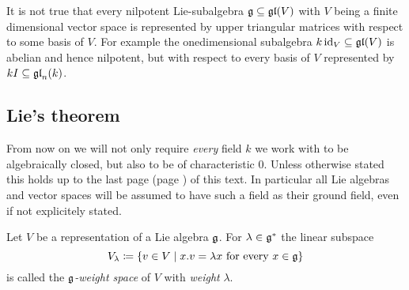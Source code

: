 \begin{rem}
 It is not true that every nilpotent Lie-subalgebra $\mathfrak{g} \subseteq \mathfrak{gl}(V)$ with $V$ being a finite dimensional vector space is represented by upper triangular matrices with respect to some basis of $V$. For example the onedimensional subalgebra $k \operatorname{id}_V \subseteq \mathfrak{gl}(V)$ is abelian and hence nilpotent, but with respect to every basis of $V$ represented by $kI \subseteq \mathfrak{gl}_n(k)$.
\end{rem}






\subsection{Lie’s theorem}


From now on we will not only require \emph{every} field $k$ we work with to be algebraically closed, but also to be of characteristic $0$. Unless otherwise stated this holds up to the last page (page \pageref{LastPage}) of this text. In particular all Lie algebras and vector spaces will be assumed to have such a field as their ground field, even if not explicitely stated.


\begin{defi}
 Let $V$ be a representation of a Lie algebra $\mathfrak{g}$. For $\lambda \in \mathfrak{g}^*$ the linear subspace
 \[
  V_\lambda \coloneqq \{v \in V \mid \text{$x.v = \lambda x$ for every $x \in \mathfrak{g}$}\}
 \]
 is called the \emph{$\mathfrak{g}$-weight space} of $V$ with \emph{weight} $\lambda$.
\end{defi}



